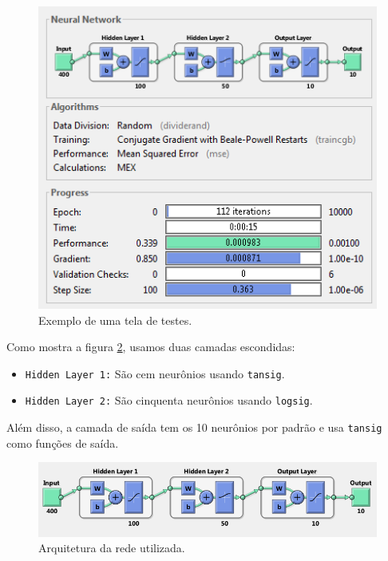 \documentclass{article}
\begin{document}
\begin{figure}[h!]
    \centering
    \includegraphics[scale=0.7]{fig0.png}
    \caption{Exemplo de uma tela de testes.}
    \label{fig0}
\end{figure}

Como mostra a figura \ref{fig1}, usamos duas camadas escondidas:
\begin{itemize} \setlength{\itemindent}{1cm}
    \item \texttt{Hidden Layer 1:}
    São cem neurônios usando \texttt{tansig}.
    \item \texttt{Hidden Layer 2:}
    São cinquenta neurônios usando \texttt{logsig}.
\end{itemize}

Além disso, a camada de saída tem os 10 neurônios por padrão e usa \texttt{tansig} como funções de saída.

\begin{figure}[h!]
    \centering
    \includegraphics[scale=0.7]{fig1.png}
    \caption{Arquitetura da rede utilizada.}
    \label{fig1}
\end{figure}
\end{document}

